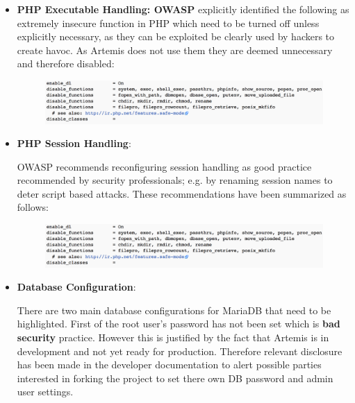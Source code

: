 \begin{enumerate}
\begin{itemize}
    
        \item \textbf{PHP Executable Handling\cite{OWASPb}: OWASP} \cite{OWASPb} explicitly identified the following as extremely insecure function in PHP which need to be turned off unless explicitly necessary, as they can be exploited be clearly used by hackers to create havoc. As Artemis does not use them they are deemed unnecessary and therefore disabled:
            
            \begin{figure}[H]
            	\centering
            	\includegraphics[scale=0.44,center]{chapters/chapter03/figures/execPHP.png}
            	\label{PHPExec}
            \end{figure}

        \item \textbf{PHP Session Handling}\cite{OWASPb}:
        
        OWASP recommends reconfiguring session handling\cite{OWASPb} as good practice recommended by security professionals; e.g. by renaming session names to deter script based attacks. These recommendations have been summarized as follows:

            \begin{figure}[H]
            	\centering
            	\includegraphics[scale=0.44,center]{chapters/chapter03/figures/execPHP.png}
            	\label{PHPSess}
            \end{figure}  
            
        \item \textbf{Database Configuration}\cite{OWASPb}:
        
        There are two main database configurations for MariaDB that need to be highlighted. First of the root user's password has not been set which is \textbf{bad security} practice. However this is justified by the fact that Artemis is in development and not yet ready for production. Therefore relevant disclosure has been made in the developer documentation to alert possible parties interested in forking the project to set there own DB password and admin user settings.
        

\end{itemize}
\end{enumerate}
